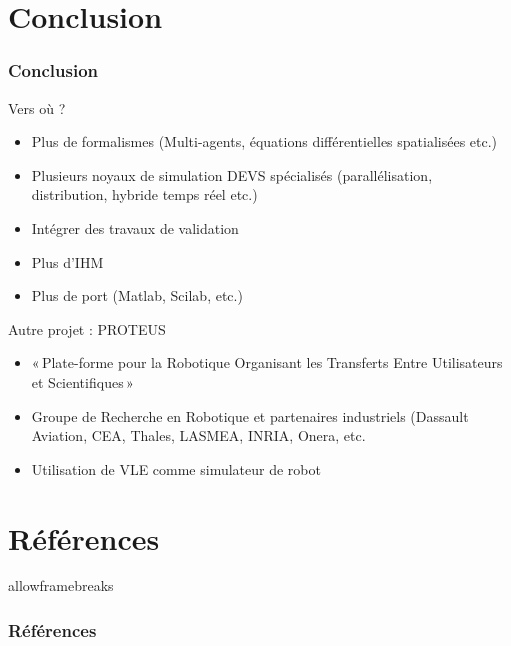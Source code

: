 \documentclass[xetex, compress, table, svgnames]{beamer}
\begin{document}
\section{Conclusion}

\begin{frame}
  \frametitle{Conclusion}
  \begin{block}{Vers où ?}
    \begin{itemize}
    \item Plus de formalismes (Multi-agents, équations différentielles
      spatialisées etc.)
    \item Plusieurs noyaux de simulation DEVS spécialisés
      (parallélisation, distribution, hybride temps réel etc.)
    \item Intégrer des travaux de validation
    \item Plus d'IHM
    \item Plus de port (Matlab, Scilab, etc.)
    \end{itemize}
  \end{block}
  \pause
  \begin{block}{Autre projet : PROTEUS}
    \begin{itemize}
      \item «\,Plate-forme pour la Robotique Organisant les Transferts
        Entre Utilisateurs et Scientifiques\,»
      \item Groupe de Recherche en Robotique et partenaires industriels
        (Dassault Aviation, CEA, Thales, LASMEA, INRIA, Onera, etc.
      \item Utilisation de VLE comme simulateur de robot
    \end{itemize}
  \end{block}
\end{frame}

\section*{Références}

\begin{frame}{allowframebreaks}
  \frametitle{Références}
  \small{%
    
    
}
\end{frame}
\end{document}
